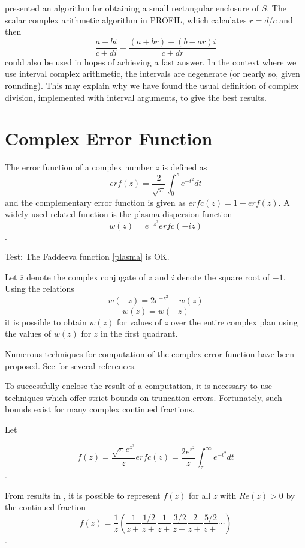 \documentclass{report}
\begin{document}
\cite{RL71} presented an algorithm for obtaining a small 
rectangular enclosure of $S$.  The scalar complex arithmetic
algorithm in PROFIL, which calculates $r = d/c$ and then
$$
\frac{a+bi}{c+di} = \frac{(a+br)+(b-ar)i}{c+dr}
$$
could also be used in hopes of achieving a fast answer.  In the context where
we use interval complex arithmetic, the intervals are degenerate (or nearly
so, given rounding).  This may explain why we have found the usual definition
of complex division, implemented with interval arguments, to give the best
results.

\section{Complex Error Function}

The error function of a complex number $z$ is defined as 
$$
erf(z) = \frac{2}{\sqrt{\pi}}\int_0^z e^{-t^2} dt
$$
and the complementary error function is given as $erfc(z) = 1 - erf(z)$.
A widely-used related function is the plasma dispersion function
\begin{equation}
w(z) = e^{-z^2}erfc(-iz)  \label{plasma}
\end{equation}.

Test:  The Faddeeva function \ref{plasma} is OK.

Let $\overline{z}$ denote the complex conjugate of $z$ and $i$ denote the
square root of $-1$.  Using the relations
$$
w(-z) = 2 e^{-z^2}-w(z)
$$
$$
w(\overline{z}) = \overline{w(-z)}
$$
it is possible to obtain $w(z)$ for values of $z$ over the entire complex plan
using the values of $w(z)$ for $z$ in the first quadrant.

Numerous techniques for computation of the complex error function have been
proposed.  See \cite{Weideman} for several references.

To successfully enclose the result of a computation, it is necessary to use
techniques which offer strict bounds on truncation errors.  Fortunately, such
bounds exist for many complex continued fractions.  

Let 

$$
f(z) = \frac{\sqrt\pi e^{z^2}}{z}erfc(z) =
\frac{2 e^{z^2}}{z}\int_z^\infty e^{-t^2} dt
$$
.

From results in \cite{JonesThron}, it is possible to represent $f(z)$ for all
$z$ with $Re(z) > 0$ by the continued fraction
$$
f(z) = \frac{1}{z} \left( \frac{1}{z+} \frac{1/2}{z+} \frac{1}{z+} 
\frac{3/2}{z+} \frac{2}{z+} \frac{5/2}{z+} \cdots \right)
$$.
\end{document}
